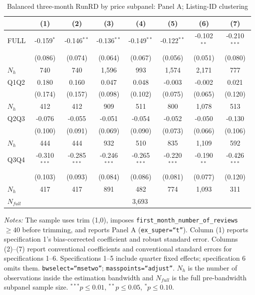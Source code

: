 \begin{table}[!htbp]
\centering
\caption{Balanced three-month RunRD by price subpanel: Panel A; Listing-ID clustering}
\scriptsize
\setlength{\tabcolsep}{5pt}
\begin{tabular}{l*{7}{c}}
\toprule
 & (1) & (2) & (3) & (4) & (5) & (6) & (7) \\
\midrule
FULL & -0.159$^{*}$ & -0.146$^{**}$ & -0.136$^{**}$ & -0.149$^{**}$ & -0.122$^{**}$ & -0.102$^{**}$ & -0.210$^{***}$ \\
 & (0.086) & (0.074) & (0.064) & (0.067) & (0.056) & (0.051) & (0.080) \\
$N_h$ & 740 & 740 & 1,596 & 993 & 1,574 & 2,171 & 777 \\
\addlinespace
Q1Q2 & 0.180 & 0.160 & 0.047 & 0.048 & -0.003 & -0.002 & 0.021 \\
 & (0.174) & (0.157) & (0.098) & (0.102) & (0.075) & (0.065) & (0.120) \\
$N_h$ & 412 & 412 & 909 & 511 & 800 & 1,078 & 513 \\
\addlinespace
Q2Q3 & -0.076 & -0.055 & -0.051 & -0.054 & -0.052 & -0.050 & -0.130 \\
 & (0.100) & (0.091) & (0.069) & (0.090) & (0.073) & (0.066) & (0.106) \\
$N_h$ & 444 & 444 & 932 & 510 & 835 & 1,109 & 592 \\
\addlinespace
Q3Q4 & -0.310$^{***}$ & -0.285$^{***}$ & -0.246$^{***}$ & -0.265$^{***}$ & -0.220$^{***}$ & -0.190$^{**}$ & -0.426$^{***}$ \\
 & (0.103) & (0.093) & (0.084) & (0.086) & (0.081) & (0.077) & (0.120) \\
$N_h$ & 417 & 417 & 891 & 482 & 774 & 1,093 & 311 \\

\midrule
$N_{full}$ & \multicolumn{7}{c}{3,693} \\
\bottomrule
\end{tabular}
\begin{minipage}{0.98\textwidth}
\footnotesize
\textit{Notes:} The sample uses trim (1,0), imposes \texttt{first\_month\_number\_of\_reviews}$\geq40$ before trimming, and reports Panel A (\texttt{ex\_super=``t''}). Column (1) reports specification 1's bias-corrected coefficient and robust standard error. Columns (2)--(7) report conventional coefficients and conventional standard errors for specifications 1--6. Specifications 1--5 include quarter fixed effects; specification 6 omits them. \texttt{bwselect=``msetwo''}; \texttt{masspoints=``adjust''}. $N_h$ is the number of observations inside the estimation bandwidth and $N_{full}$ is the full pre-bandwidth subpanel sample size. $^{***}p\leq0.01$, $^{**}p\leq0.05$, $^{*}p\leq0.10$.
\end{minipage}
\end{table}
\clearpage

